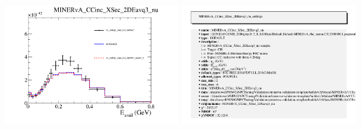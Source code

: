 \documentclass{article}
\begin{document}
\centering
\includegraphics[width=0.49\textwidth]{figures/cc_visEq3_xsec_CV_WithErr_slice_5_comp.png}
\includegraphics[width=0.49\textwidth]{figures/cc_visEq3_xsec_CV_WithErr_info.png}
\end{document}
